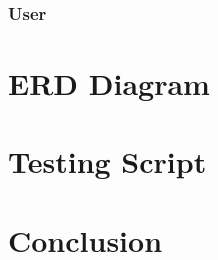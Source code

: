 \documentclass{scrartcl}
\begin{document}
\subsubsection{User}

\section{ERD Diagram}

\section{Testing Script}

\section{Conclusion}

\newpage







\end{document}
